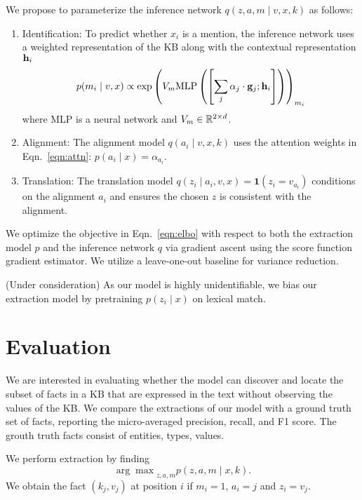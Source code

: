 \documentclass[12pt]{article}
\begin{document}
We propose to parameterize the inference network $q(z,a,m\mid v,x,k)$ as follows:
\begin{enumerate}
\item Identification: To predict whether $x_i$ is a mention,
    the inference network uses a weighted representation of the KB
    along with the contextual representation $\mathbf{h}_i$
    \begin{equation}
    p(m_i \mid v,x) \propto
    \exp\left(V_m
    \textrm{MLP}\left(\left[\sum_j \alpha_j \cdot \mathbf{g}_j; \mathbf{h}_i\right]\right)\right)_{m_i}
    \end{equation}
    where MLP is a neural network and $V_m \in \mathbb{R}^{2 \times d}$.
\item Alignment: The alignment model $q(a_i \mid v,x,k)$
    uses the attention weights in Eqn.~\ref{eqn:attn}:
    $p(a_i \mid x) = \alpha_{a_i}$.
\item Translation: The translation model
    $q(z_i \mid a_i,v,x) = \mathbf{1}(z_i = v_{a_i})$
    conditions on the alignment $a_i$ and ensures the chosen $z$ is consistent
    with the alignment. 
\end{enumerate}

We optimize the objective in Eqn.~\ref{eqn:elbo}
with respect to both the extraction model $p$ and the inference network $q$
via gradient ascent using the score function gradient estimator.
We utilize a leave-one-out baseline for variance reduction.

(Under consideration)
As our model is highly unidentifiable,
we bias our extraction model by pretraining $p(z_i \mid x)$ on lexical match.

\section{Evaluation}
We are interested in evaluating whether the model can discover
and locate the subset of facts in a KB that are expressed in the text
without observing the values of the KB.
We compare the extractions of our model with a ground truth set of facts,
reporting the micro-averaged precision, recall, and F1 score.
The grouth truth facts consist of entities, types, values.

We perform extraction by finding
$${\arg\max}_{z,a,m} p(z,a,m\mid x,k).$$
We obtain the fact $(k_j, v_j)$ at position $i$ if $m_i=1$,
$a_i = j$ and $z_i = v_j$.
\end{document}
